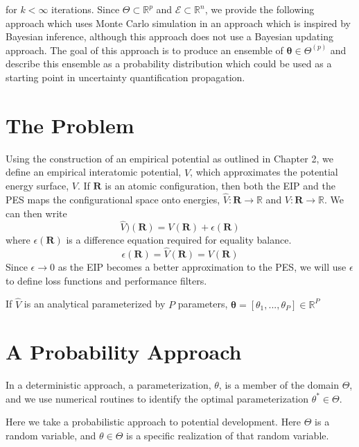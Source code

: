 for $k < \infty$ iterations.  Since $\Theta \subset \mathbb{R}^p$ and $\mathcal{E} \subset \mathbb{R}^n$, we provide the following approach which uses Monte Carlo simulation in an approach which is inspired by Bayesian inference, although this approach does not use a Bayesian updating approach.  The goal of this approach is to produce an ensemble of $\bm{\theta}\in \Theta^{(p)}$ and describe this ensemble as a probability distribution which could be used as a starting point in uncertainty quantification propagation.

\section{The Problem}

Using the construction of an empirical potential as outlined in Chapter 2, we define an empirical interatomic potential, $\hat{V}$, which approximates the potential energy surface, $V$.
If $\bm{R}$ is an atomic configuration, then both the EIP and the PES maps the configurational space onto energies, $\hat{V}:\bm{R} \rightarrow \mathbb{R}$ and $V:\bm{R} \rightarrow \mathbb{R}$.
We can then write
\begin{equation}
    \hat{V})(\bm{R}) = V(\bm{R}) + \epsilon(\bm{R})
\end{equation}
where $\epsilon(\bm{R})$ is a difference equation required for equality balance.
\begin{equation}
    \epsilon(\bm{R}) = \hat{V}(\bm{R}) = V(\bm{R})
\end{equation}
Since ${\epsilon \rightarrow 0}$ as the EIP becomes a better approximation to the PES, we will use $\epsilon$ to define loss functions and performance filters.

If $\hat{V}$ is an analytical parameterized by $P$ parameters, $\bm{\theta}=[\theta_1,...,\theta_P]\in\mathbb{R}^P$

\section{A Probability Approach}

In a deterministic approach, a parameterization, $\theta$, is a member of the domain $\Theta$, and we use numerical routines to identify the optimal parameterization $\theta^*\in\Theta$.

Here we take a probabilistic approach to potential development.
Here $\Theta$ is a random variable, and $\theta\in\Theta$ is a specific realization of that random variable.

